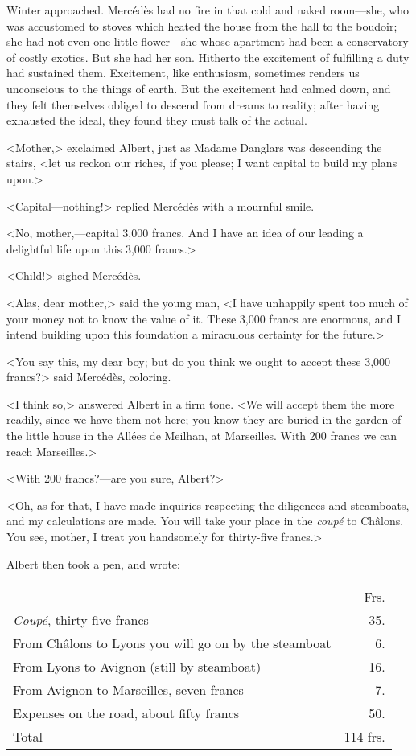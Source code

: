  Winter approached. Mercédès had no fire in that cold and naked room—she, who was accustomed to stoves which heated the house from the hall to the boudoir; she had not even one little flower—she whose apartment had been a conservatory of costly exotics. But she had her son. Hitherto the excitement of fulfilling a duty had sustained them. Excitement, like enthusiasm, sometimes renders us unconscious to the things of earth. But the excitement had calmed down, and they felt themselves obliged to descend from dreams to reality; after having exhausted the ideal, they found they must talk of the actual. 

 <Mother,> exclaimed Albert, just as Madame Danglars was descending the stairs, <let us reckon our riches, if you please; I want capital to build my plans upon.> 

 <Capital—nothing!> replied Mercédès with a mournful smile. 

 <No, mother,—capital 3,000 francs. And I have an idea of our leading a delightful life upon this 3,000 francs.> 

 <Child!> sighed Mercédès. 

 <Alas, dear mother,> said the young man, <I have unhappily spent too much of your money not to know the value of it. These 3,000 francs are enormous, and I intend building upon this foundation a miraculous certainty for the future.> 

 <You say this, my dear boy; but do you think we ought to accept these 3,000 francs?> said Mercédès, coloring. 

 <I think so,> answered Albert in a firm tone. <We will accept them the more readily, since we have them not here; you know they are buried in the garden of the little house in the Allées de Meilhan, at Marseilles. With 200 francs we can reach Marseilles.> 

 <With 200 francs?—are you sure, Albert?> 

 <Oh, as for that, I have made inquiries respecting the diligences and steamboats, and my calculations are made. You will take your place in the \textit{coupé} to Châlons. You see, mother, I treat you handsomely for thirty-five francs.> 

 Albert then took a pen, and wrote: 
 
 \begin{tabular} {l@{\dotfill}r} 
 
\multicolumn{1}{l}{~} & \multicolumn{1}{r}{Frs.} \\
\textit{Coupé}, thirty-five francs&35.\\
From Châlons to Lyons you will go on by the steamboat&6.\\
From Lyons to Avignon (still by steamboat)&16.\\
From Avignon to Marseilles, seven francs&7.\\
Expenses on the road, about fifty francs&50.\\
Total&114 frs.\\
\end{tabular}
\bigskip

